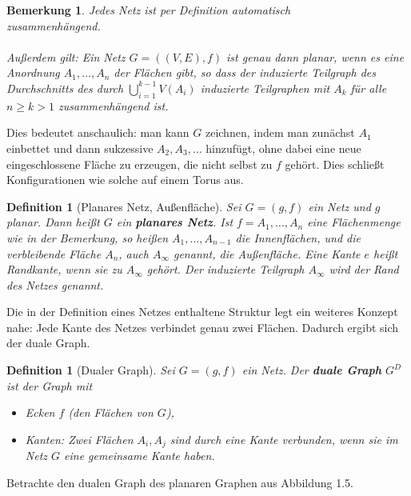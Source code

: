 \documentclass[11pt,a4paper,leqno]{report}
\newtheorem{definition}[theorem]{Definition}
\newtheorem{remark}[theorem]{Bemerkung}
\numberwithin{equation}{chapter}
\begin{document}
\noindent
\begin{remark}
	Jedes Netz ist per Definition automatisch \\zusammenhängend. \\
	\\
	Außerdem gilt: 
	Ein Netz $G=((V, E),f)$ ist genau dann planar, wenn es eine Anordnung ${A_1,\dots,A_n}$ der Flächen gibt, so dass der induzierte Teilgraph des Durchschnitts des durch $\bigcup_{i=1}^{k-1}V(A_i)$ induzierte Teilgraphen mit $A_k$ für alle $n\geq k > 1$ zusammenhängend ist.\\
\end{remark}
\noindent
Dies bedeutet anschaulich: man kann $G$ zeichnen, indem man zunächst $A_1$ einbettet und dann sukzessive $A_2,A_3,\dots$ hinzufügt, ohne dabei eine neue eingeschlossene Fläche zu erzeugen, die nicht selbst zu $f$ gehört. Dies schließt Konfigurationen wie solche auf einem Torus aus.
\begin{definition}[Planares Netz, Außenfläche]
Sei $G=(g,f)$ ein Netz und $g$ planar. Dann heißt $G$ ein \textbf{planares Netz}.
Ist $f={A_1,\dots,A_n}$ eine Flächenmenge wie in der Bemerkung, so heißen $A_1,\dots,A_{n-1}$ die Innenflächen, und die verbleibende Fläche $A_n$, auch $A_\infty$ genannt, die Außenfläche.
Eine Kante $e$ heißt Randkante, wenn sie zu $A_\infty$ gehört. Der induzierte Teilgraph $A_\infty$ wird der Rand des Netzes genannt. 
\end{definition}
\noindent
Die in der Definition eines Netzes enthaltene Struktur legt ein weiteres Konzept nahe: Jede Kante des Netzes verbindet genau zwei Flächen. Dadurch ergibt sich der duale Graph.
\begin{definition}[Dualer Graph]
	Sei $G=(g,f)$ ein Netz. Der \textbf{duale Graph} $G^D$ ist der Graph mit
	\begin{itemize}
		\item Ecken $f$ (den Flächen von $G$),
		\item Kanten: Zwei Flächen $A_i,A_j$ sind durch eine Kante verbunden, wenn sie im Netz $G$ eine gemeinsame Kante haben.
	\end{itemize}
\end{definition}
\noindent
Betrachte den dualen Graph des planaren Graphen aus Abbildung 1.5. 
\end{document}
